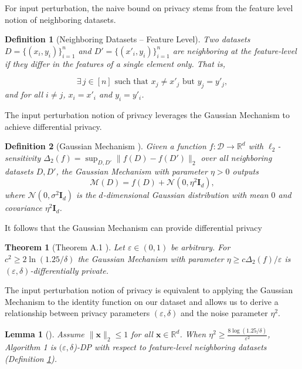 \documentclass[11pt,letterpaper]{article}
\newtheorem{theorem}{Theorem}
\newtheorem{lemma}{Lemma}
\newtheorem{definition}{Definition}
\begin{document}
For input perturbation, the naive bound on privacy stems from the feature level notion of neighboring datasets.



\begin{definition}[Neighboring Datasets -- Feature Level] \label{def:feature_neighbor}
Two datasets $D = \{(x_i,y_i)\}_{i=1}^n$ and $D' = \{(x'_i,y_i)\}_{i=1}^n$ are neighboring at the \emph{feature-level} if they differ in the features of a single element only. That is,

$$\exists\, j \in [n] \text{ such that } x_j \neq x'_j \text{ but } y_j=y'_j,
$$
and for all $i \neq j$, $x_i = x'_i$ and $y_i = y'_i$.
\end{definition}


The input perturbation notion of privacy leverages the Gaussian Mechanism to achieve differential privacy.

\begin{definition}[Gaussian Mechanism \citep{dwork2014algorithmic}]
Given a function $f : \mathcal{D} \to \mathbb{R}^d$ with $\ell_2$-sensitivity 
$\Delta_2(f) = \sup_{D, D'} \| f(D) - f(D') \|_2$ over all neighboring datasets $D, D'$, 
the Gaussian Mechanism with parameter $\eta > 0$ outputs
$$
\mathcal{M}(D) = f(D) + \mathcal{N}(0, \eta^2 \bm{I}_d),
$$
where $\mathcal{N}(0, \sigma^2 \bm{I}_d)$ is the $d$-dimensional Gaussian distribution with mean $0$ and covariance $\eta^2 \bm{I}_d$.
\end{definition}

It follows that the Gaussian Mechanism can provide differential privacy

\begin{theorem} [Theorem A.1 \citep{dwork2014algorithmic}]
     Let $\varepsilon \in (0,1)$ be arbitrary. For $c^2 \geq 2 \ln (1.25/\delta)$ the Gaussian Mechanism with parameter $\eta \geq c\Delta_2(f)/\varepsilon$ is $(\varepsilon, \delta)$-differentially private.
\end{theorem}


The input perturbation notion of privacy is equivalent to applying the Gaussian Mechanism to the identity function on our dataset and allows us to derive a relationship between privacy parameters $(\varepsilon, \delta)$ and the noise parameter $\eta^2$.

\begin{lemma}[\citet{dwork2014algorithmic}] \label{thm:dwork}
    Assume $\| \mathbf{x} \|_2 \leq 1$ for all $\mathbf{x} \in \mathbb{R}^d$. When $\eta^2 \geq \frac{8\log(1.25/\delta)}{\varepsilon^2}$, Algorithm 1 is $(\varepsilon, \delta$)-DP with respect to feature-level neighboring datasets (Definition \ref{def:feature_neighbor}).
\end{lemma}
\end{document}
